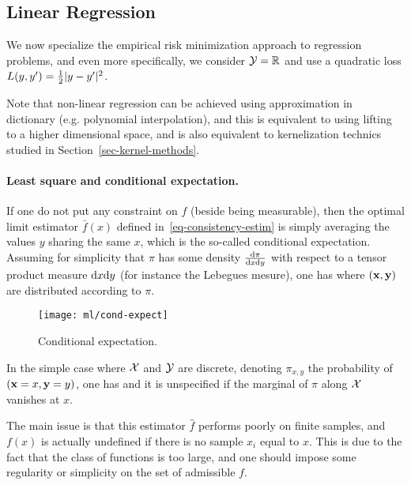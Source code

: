 \subsection{Linear Regression}
\label{sec-linear-models}

We now specialize the empirical risk minimization approach to regression problems, and even more specifically, we consider $\mathcal{Y}=\mathbb{R}$ and use a quadratic loss $L(y,y')=\frac{1}{2}|y-y'|^2$.

Note that non-linear regression can be achieved using approximation in dictionary (e.g. polynomial interpolation), and this is equivalent to using lifting to a higher dimensional space, and is also equivalent to kernelization technics studied in Section~\ref{sec-kernel-methods}. 

\paragraph{Least square and conditional expectation.}

If one do not put any constraint on $f$ (beside being measurable), then the optimal limit estimator $\bar f(x)$ defined in~\eqref{eq-consistency-estim} is simply averaging the values $y$ sharing the same $x$, which is the so-called conditional expectation. 
%
Assuming for simplicity that $\pi$ has some density $\frac{\mathrm{d} \pi}{\mathrm{d} x \mathrm{d} y}$ with respect to a tensor product measure $\mathrm{d} x \mathrm{d} y$ (for instance the Lebegues mesure), one has
where $(\mathrm{\bf x},\mathrm{\bf y})$ are distributed according to $\pi$.


\begin{figure}
\centering
\texttt{[image: ml/cond-expect]}
\caption{\label{fig-bound-regul}
Conditional expectation.
}
\end{figure}

In the simple case where $\mathcal{X}$ and $\mathcal{Y}$ are discrete, denoting $\pi_{x,y}$ the probability of $(\mathrm{\bf x}=x,\mathrm{\bf y}=y)$, one has
and it is unspecified if the marginal of $\pi$ along $\mathcal{X}$ vanishes at $x$. 

The main issue is that this estimator $\hat f$ performs poorly on finite samples, and $f(x)$ is actually undefined if there is no sample $x_i$ equal to $x$. This is due to the fact that the class of functions is too large, and one should impose some regularity or simplicity on the set of admissible $f$.



